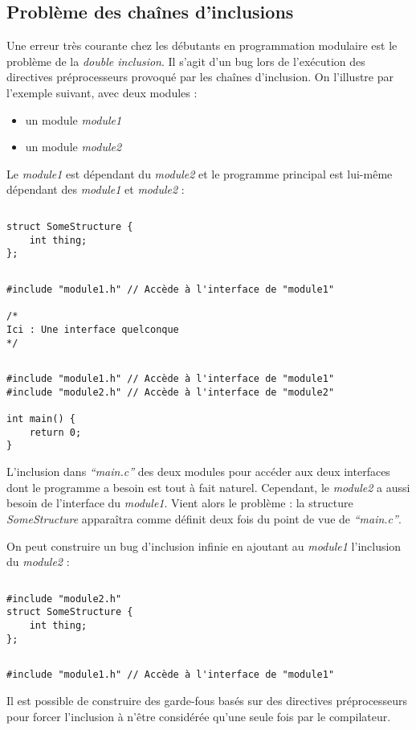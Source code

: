 \documentclass[../../../main.tex]{subfiles}
\begin{document}
\subsection{Problème des chaînes d'inclusions}
Une erreur très courante chez les débutants en programmation modulaire est le problème de la \textit{double inclusion}. Il s'agit d'un bug lors de l'exécution des directives préprocesseurs provoqué par les chaînes d'inclusion. On l'illustre par l'exemple suivant, avec deux modules :
\begin{itemize}
	\item un module \textit{module1}
	\item un module \textit{module2}
\end{itemize}
Le \textit{module1} est dépendant du \textit{module2} et le programme principal est lui-même dépendant des \textit{module1} et \textit{module2} :
\begin{lstlisting}[title=module1.h]
\end{lstlisting}
\begin{verbatim}
struct SomeStructure {
	int thing;
};
\end{verbatim}
\begin{lstlisting}[title=module2.h]
\end{lstlisting}
\begin{verbatim}
#include "module1.h" // Accède à l'interface de "module1"

/*
Ici : Une interface quelconque
*/
\end{verbatim}
\begin{lstlisting}[title=main.c]
\end{lstlisting}
\begin{verbatim}
#include "module1.h" // Accède à l'interface de "module1"
#include "module2.h" // Accède à l'interface de "module2"

int main() {
	return 0;
}
\end{verbatim}
L'inclusion dans \textit{``main.c''} des deux modules pour accéder aux deux interfaces dont le programme a besoin est tout à fait naturel. Cependant, le \textit{module2} a aussi besoin de l'interface du \textit{module1}. Vient alors le problème : la structure \textit{SomeStructure} apparaîtra comme définit deux fois du point de vue de \textit{``main.c''}.
 
On peut construire un bug d'inclusion infinie en ajoutant au \textit{module1} l'inclusion du \textit{module2} :
\begin{lstlisting}[title=module1.h]
\end{lstlisting}
\begin{verbatim}
#include "module2.h"
struct SomeStructure {
	int thing;
};
\end{verbatim}
\begin{lstlisting}[title=module2.h]
\end{lstlisting}
\begin{verbatim}
#include "module1.h" // Accède à l'interface de "module1"
\end{verbatim}
Il est possible de construire des garde-fous basés sur des directives préprocesseurs pour forcer l'inclusion à n'être considérée qu'une seule fois par le compilateur.
\end{document}
